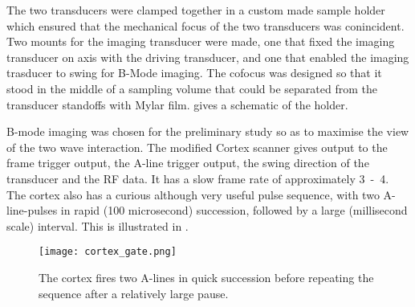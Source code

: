 
The two transducers were clamped together in a custom made sample holder which ensured that the mechanical focus of the two transducers was conincident.  
Two mounts for the imaging transducer were made, one that fixed the imaging transducer on axis with the driving transducer, and one that enabled the imaging trasducer to swing for B-Mode imaging.
The cofocus was designed so that it stood in the middle of a sampling volume that could be separated from the transducer standoffs with Mylar film.  
 gives a schematic of the holder.


B-mode imaging was chosen for the preliminary study
so as to  maximise the view of the two wave interaction.
The modified  Cortex scanner gives output to the frame trigger output, the
A-line trigger output, the swing
direction  of the transducer and the RF data.
It has a slow frame rate of  approximately \unit{3-4}\hertz.
The cortex also has a curious although very useful pulse sequence, with two
A-line-pulses in rapid (100 microsecond) succession, followed by a large (millisecond
scale) interval.
This is illustrated in .

\begin{figure}[h]
     \centering
          \texttt{[image: cortex\_gate.png]}
     \caption{The cortex fires two A-lines in quick succession before
       repeating the sequence after a
     relatively large pause.}
          \label{fig:exp:cortex_gate}
\end{figure}


